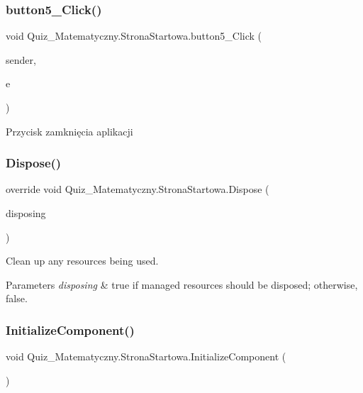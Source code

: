 \subsubsection{\texorpdfstring{button5\_Click()}{button5\_Click()}}
{\footnotesize\ttfamily void Quiz\+\_\+\+Matematyczny.\+Strona\+Startowa.\+button5\+\_\+\+Click (\begin{DoxyParamCaption}\item[{object}]{sender,  }\item[{Event\+Args}]{e }\end{DoxyParamCaption})\hspace{0.3cm}{\ttfamily [private]}}

Przycisk zamknięcia aplikacji \mbox{\label{class_quiz___matematyczny_1_1_strona_startowa_a22ff6f051d145644baad291ae08735d9}} 
\subsubsection{\texorpdfstring{Dispose()}{Dispose()}}
{\footnotesize\ttfamily override void Quiz\+\_\+\+Matematyczny.\+Strona\+Startowa.\+Dispose (\begin{DoxyParamCaption}\item[{bool}]{disposing }\end{DoxyParamCaption})\hspace{0.3cm}{\ttfamily [protected]}}



Clean up any resources being used. 


\begin{DoxyParams}{Parameters}
{\em disposing} & true if managed resources should be disposed; otherwise, false.\\
\hline
\end{DoxyParams}
\mbox{\label{class_quiz___matematyczny_1_1_strona_startowa_ab0279222230ec5cc60e0ee3026204921}} 
\subsubsection{\texorpdfstring{InitializeComponent()}{InitializeComponent()}}
{\footnotesize\ttfamily void Quiz\+\_\+\+Matematyczny.\+Strona\+Startowa.\+Initialize\+Component (\begin{DoxyParamCaption}{ }\end{DoxyParamCaption})\hspace{0.3cm}{\ttfamily [private]}}




